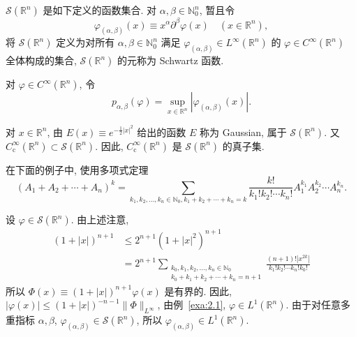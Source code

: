 \begin{definition}\label{def:5.1}
$\mathcal{S}(\mathbb{R}^{n})$ 是如下定义的函数集合. 对 $\alpha, \beta \in \mathbb{N}_{0}^{n}$, 暂且令
\begin{equation}\tag{5.1}
\varphi_{(\alpha,\beta)}(x) \equiv x^{\alpha}\partial^{\beta}\varphi(x) \quad (x \in \mathbb{R}^{n}),
\label{eq:5.1}
\end{equation}
将 $\mathcal{S}(\mathbb{R}^{n})$ 定义为对所有 $\alpha, \beta \in \mathbb{N}_{0}^{n}$ 满足 $\varphi_{(\alpha,\beta)} \in L^{\infty}(\mathbb{R}^{n})$ 的 $\varphi \in C^{\infty}(\mathbb{R}^{n})$ 全体构成的集合, $\mathcal{S}(\mathbb{R}^{n})$ 的元称为 Schwartz 函数.
\end{definition}

对 $\varphi \in C^{\infty}(\mathbb{R}^{n})$, 令
\[
p_{\alpha,\beta}(\varphi) = \sup_{x \in \mathbb{R}^{n}}|\varphi_{(\alpha,\beta)}(x)|.
\]

\begin{example}\label{exa:5.1}
对 $x \in \mathbb{R}^{n}$, 由 $E(x) \equiv e^{-\frac{1}{2}|x|^{2}}$ 给出的函数 $E$ 称为 Gaussian, 属于 $\mathcal{S}(\mathbb{R}^{n})$. 又 $C_{\mathrm{c}}^{\infty}(\mathbb{R}^{n}) \subset \mathcal{S}(\mathbb{R}^{n})$. 因此, $C_{\mathrm{c}}^{\infty}(\mathbb{R}^{n})$ 是 $\mathcal{S}(\mathbb{R}^{n})$ 的真子集.
\end{example}

在下面的例子中, 使用多项式定理
\[
(A_{1} + A_{2} + \cdots + A_{n})^{k} = \sum_{k_{1}, k_{2}, \ldots, k_{n} \in \mathbb{N}_{0}, k_{1} + k_{2} + \cdots + k_{n} = k}\frac{k!}{k_{1}!k_{2}!\cdots k_{n}!}A_{1}^{k_{1}}A_{2}^{k_{2}}\cdots A_{n}^{k_{n}}.
\]

\begin{example}\label{exa:5.2}
设 $\varphi \in \mathcal{S}(\mathbb{R}^{n})$. 由上述注意,
\begin{align*}
(1+|x|)^{n+1} &\leq 2^{n+1}(1+|x|^{2})^{n+1} \\
&= 2^{n+1}\sum_{\substack{k_{0}, k_{1}, k_{2}, \ldots, k_{n} \in \mathbb{N}_{0} \\ k_{0}+k_{1}+k_{2}+\cdots+k_{n}=n+1}}\frac{(n+1)!|x^{2k}|}{k_{1}!k_{2}!\cdots k_{n}!k_{0}!}
\end{align*}
所以 $\Phi(x) \equiv (1+|x|)^{n+1}\varphi(x)$ 是有界的. 因此, $|\varphi(x)| \leq (1+|x|)^{-n-1}\|\Phi\|_{L^{\infty}}$, 由例~\ref{exa:2.1}, $\varphi \in L^{1}(\mathbb{R}^{n})$. 由于对任意多重指标 $\alpha, \beta$, $\varphi_{(\alpha,\beta)} \in \mathcal{S}(\mathbb{R}^{n})$, 所以 $\varphi_{(\alpha,\beta)} \in L^{1}(\mathbb{R}^{n})$.
\end{example}

